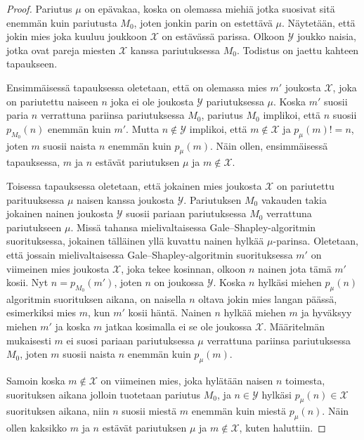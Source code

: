 \documentclass[finnish]{tktltiki2}
\theoremstyle{definition}
\theoremstyle{remark}
\begin{document}
\begin{proof}\label{strategy-blockingtod}
	Pariutus $\mu$ on epävakaa, koska on olemassa miehiä jotka suosivat sitä enemmän kuin pariutusta $M_0$, joten jonkin parin on estettävä $\mu$. Näytetään, että jokin mies joka kuuluu joukkoon $\mathcal{X}$ on estävässä parissa. Olkoon $\mathcal{Y}$ joukko naisia, jotka ovat pareja miesten $\mathcal{X}$ kanssa pariutuksessa $M_0$. Todistus on jaettu kahteen tapaukseen.
	
	Ensimmäisessä tapauksessa oletetaan, että on olemassa mies $m'$ joukosta $\mathcal{X}$, joka on pariutettu naiseen $n$ joka ei ole joukosta $\mathcal{Y}$ pariutuksessa $\mu$. Koska $m'$ suosii paria $n$ verrattuna pariinsa pariutuksessa $M_0$, pariutus $M_0$ implikoi, että $n$ suosii $p_{M_0}(n)$ enemmän kuin $m'$. Mutta $n \notin \mathcal{Y}$ implikoi, että $m \notin \mathcal{X}$ ja $p_\mu(m) != n$, joten $m$ suosii naista $n$ enemmän kuin $p_\mu(m)$. Näin ollen, ensimmäisessä tapauksessa, $m$ ja $n$ estävät pariutuksen $\mu$ ja $m \notin \mathcal{X}$.
	
	Toisessa tapauksessa oletetaan, että jokainen mies joukosta $\mathcal{X}$ on pariutettu parituuksessa $\mu$ naisen kanssa joukosta $\mathcal{Y}$. Pariutuksen $M_0$ vakauden takia jokainen nainen joukosta $\mathcal{Y}$ suosii pariaan pariutuksessa $M_0$ verrattuna pariutukseen $\mu$. Missä tahansa mielivaltaisessa Gale--Shapley-algoritmin suorituksessa, jokainen tälläinen yllä kuvattu nainen hylkää $\mu$-parinsa. Oletetaan, että jossain mielivaltaisessa Gale--Shapley-algoritmin suorituksessa $m'$ on viimeinen mies joukosta $\mathcal{X}$, joka tekee kosinnan, olkoon $n$ nainen jota tämä $m'$ kosii. Nyt $n = p_{M_0}(m')$, joten $n$ on joukossa $\mathcal{Y}$. Koska $n$ hylkäsi miehen $p_\mu(n)$ algoritmin suorituksen aikana, on naisella $n$ oltava jokin mies langan päässä, esimerkiksi mies $m$, kun $m'$ kosii häntä. Nainen $n$ hylkää miehen $m$ ja hyväksyy miehen $m'$ ja koska $m$ jatkaa kosimalla ei se ole joukossa $\mathcal{X}$. Määritelmän mukaisesti $m$ ei suosi pariaan pariutuksessa $\mu$ verrattuna pariinsa pariutuksessa $M_0$, joten $m$ suosii naista $n$ enemmän kuin $p_\mu(m)$.
	
	Samoin koska $m \notin \mathcal{X}$ on viimeinen mies, joka hylätään naisen $n$ toimesta, suorituksen aikana jolloin tuotetaan pariutus $M_0$, ja $n \in \mathcal{Y}$ hylkäsi $p_\mu(n) \in \mathcal{X}$ suorituksen aikana, niin $n$ suosii miestä $m$ enemmän kuin miestä $p_\mu(n)$. Näin ollen kaksikko $m$ ja $n$ estävät pariutuksen $\mu$ ja $m \notin \mathcal{X}$, kuten haluttiin.	
\end{proof}
\end{document}
